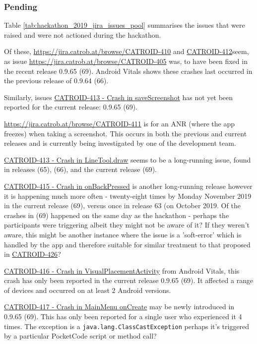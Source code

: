 \subsubsection{Pending} 
Table \ref{tab:hackathon_2019_jira_issues_pool} summarises the issues that were raised and were not actioned during the hackathon.

Of these, \href{CATROID-410}{https://jira.catrob.at/browse/CATROID-410} and \href{https://jira.catrob.at/browse/CATROID-412}{CATROID-412}seem, as issue \href{CATROID-405}{https://jira.catrob.at/browse/CATROID-405} was, to have been fixed in the recent release 0.9.65 (69). Android Vitals shows these crashes last occurred in the previous release of 0.9.64 (66).

Similarly, issues \href{https://jira.catrob.at/browse/CATROID-413}{CATROID-413 - Crash in saveScreenshot} has not yet been reported for the current release: 0.9.65 (69).

\href{CATROID-411}{https://jira.catrob.at/browse/CATROID-411} is for an ANR (where the app freezes) when taking a screenshot. This occurs in both the previous and current releases and is currently being investigated by one of the development team.

\href{https://jira.catrob.at/browse/CATROID-413}{CATROID-413 - Crash in LineTool.draw} seems to be a long-running issue, found in releases (65), (66), and the current release (69).

\href{https://jira.catrob.at/browse/CATROID-415}{CATROID-415 - Crash in onBackPressed} is another long-running release however it is happening much more often - twenty-eight times by Monday  November 2019 in the current release (69), versus once in release 63 (on  October 2019. Of the crashes in (69) happened on the same day as the hackathon - perhaps the participants were triggering albeit they might not be aware of it? If they weren't aware, this might be another instance where the issue is a 'soft-error' which is handled by the app and therefore suitable for similar treatment to that proposed in \href{https://jira.catrob.at/browse/CATROID-426}{CATROID-426}?

\href{https://jira.catrob.at/browse/CATROID-416}{CATROID-416 - Crash in VisualPlacementActivity} from Android Vitals, this crash has only been reported in the current release 0.9.65 (69). It affected a range of devices and occurred on at least 2 Android versions.

\href{https://jira.catrob.at/browse/CATROID-417}{CATROID-417 - Crash in MainMenu onCreate} may be newly introduced in 0.9.65 (69). This has only been reported for a single user who experienced it 4 times. The exception is a \texttt{java.lang.ClassCastException} perhaps it's triggered by a particular PocketCode script or method call?

